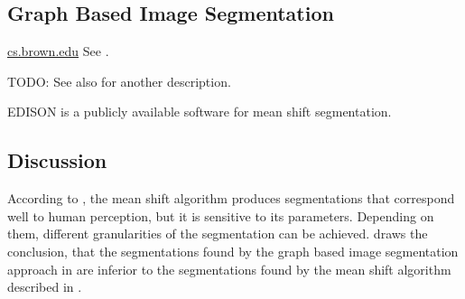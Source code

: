 \subsection{Graph Based Image Segmentation}\label{subsec:graph-based-image-segmentation}
\href{http://cs.brown.edu/~pff/segment/}{cs.brown.edu}
See \cite{felzenszwalb2004efficient}.

TODO: See also \cite{pantofaru2005comparison} for another description.

EDISON is a publicly available software for mean shift segmentation.\cite{christoudias2002synergism}


\subsection{Discussion}\label{subsec:traditional-approaches-discussion}

According to \cite{pantofaru2005comparison}, the mean shift algorithm produces
segmentations that correspond well to human perception, but it is sensitive to
its parameters. Depending on them, different granularities of the segmentation
can be achieved. \cite{pantofaru2005comparison} draws the conclusion, that
the segmentations found by the graph based image segmentation approach
in \cite{felzenszwalb2004efficient} are inferior to the segmentations found
by the mean shift algorithm described in \cite{comaniciu2002mean}.
